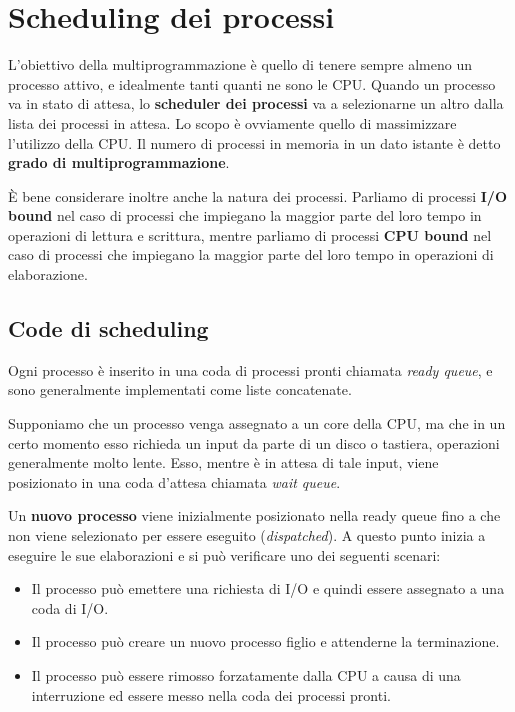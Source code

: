\section{Scheduling dei processi}
    L'obiettivo della multiprogrammazione è quello di tenere sempre almeno un processo attivo, e idealmente tanti quanti ne sono le CPU. Quando un processo va in stato di attesa, lo \textbf{scheduler dei processi} va a selezionarne un altro dalla lista dei processi in attesa. Lo scopo è ovviamente quello di massimizzare l'utilizzo della CPU. Il numero di processi in memoria in un dato istante è detto \textbf{grado di multiprogrammazione}.
    
    È bene considerare inoltre anche la natura dei processi. Parliamo di processi \textbf{I/O bound} nel caso di processi che impiegano la maggior parte del loro tempo in operazioni di lettura e scrittura, mentre parliamo di processi \textbf{CPU bound} nel caso di processi che impiegano la maggior parte del loro tempo in operazioni di elaborazione.
    
    \subsection{Code di scheduling}
        Ogni processo è inserito in una coda di processi pronti chiamata \textit{ready queue}, e sono generalmente implementati come liste concatenate.
        
        Supponiamo che un processo venga assegnato a un core della CPU, ma che in un certo momento esso richieda un input da parte di un disco o tastiera, operazioni generalmente molto lente. Esso, mentre è in attesa di tale input, viene posizionato in una coda d'attesa chiamata \textit{wait queue}.
        
        Un \textbf{nuovo processo} viene inizialmente posizionato nella ready queue fino a che non viene selezionato per essere eseguito (\textit{dispatched}). A questo punto inizia a eseguire le sue elaborazioni e si può verificare uno dei seguenti scenari:
        \begin{itemize}
            \item Il processo può emettere una richiesta di I/O e quindi essere assegnato a una coda di I/O.
            \item Il processo può creare un nuovo processo figlio e attenderne la terminazione.
            \item Il processo può essere rimosso forzatamente dalla CPU a causa di una interruzione ed essere messo nella coda dei processi pronti.
        \end{itemize}
        

